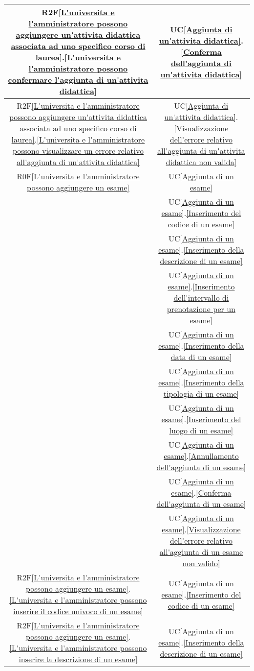 \begin{longtable}{|c|c|}
\hline
R2F\ref{L'universita e l'amministratore possono aggiungere un'attivita didattica associata ad uno specifico corso di laurea}.\ref{L'universita e l'amministratore possono confermare l'aggiunta di un'attivita didattica} & UC\ref{Aggiunta di un'attivita didattica}.\ref{Conferma dell'aggiunta di un'attivita didattica}\\
\hline
R2F\ref{L'universita e l'amministratore possono aggiungere un'attivita didattica associata ad uno specifico corso di laurea}.\ref{L'universita e l'amministratore possono visualizzare un errore relativo all'aggiunta di un'attivita didattica} & UC\ref{Aggiunta di un'attivita didattica}.\ref{Visualizzazione dell'errore relativo all'aggiunta di un'attivita didattica non valida}\\
\hline
R0F\ref{L'universita e l'amministratore possono aggiungere un esame} 
& UC\ref{Aggiunta di un esame}\\
& UC\ref{Aggiunta di un esame}.\ref{Inserimento del codice di un esame}\\
& UC\ref{Aggiunta di un esame}.\ref{Inserimento della descrizione di un esame}\\
& UC\ref{Aggiunta di un esame}.\ref{Inserimento dell'intervallo di prenotazione per un esame}\\
& UC\ref{Aggiunta di un esame}.\ref{Inserimento della data di un esame}\\
& UC\ref{Aggiunta di un esame}.\ref{Inserimento della tipologia di un esame}\\
& UC\ref{Aggiunta di un esame}.\ref{Inserimento del luogo di un esame}\\
& UC\ref{Aggiunta di un esame}.\ref{Annullamento dell'aggiunta di un esame}\\
& UC\ref{Aggiunta di un esame}.\ref{Conferma dell'aggiunta di un esame}\\
& UC\ref{Aggiunta di un esame}.\ref{Visualizzazione dell'errore relativo all'aggiunta di un esame non valido}\\
\hline
R2F\ref{L'universita e l'amministratore possono aggiungere un esame}.\ref{L'universita e l'amministratore possono inserire il codice univoco di un esame} & UC\ref{Aggiunta di un esame}.\ref{Inserimento del codice di un esame}\\
\hline
R2F\ref{L'universita e l'amministratore possono aggiungere un esame}.\ref{L'universita e l'amministratore possono inserire la descrizione di un esame} & UC\ref{Aggiunta di un esame}.\ref{Inserimento della descrizione di un esame}\\
\hline

\end{longtable}
